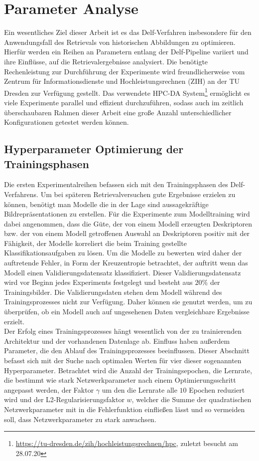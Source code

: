 \chapter{Parameter Analyse}

Ein wesentliches Ziel dieser Arbeit ist es das Delf-Verfahren insbesondere für den Anwendungsfall des Retrievals von historischen Abbildungen zu optimieren. Hierfür werden ein Reihen an Parametern entlang der Delf-Pipeline variiert und ihre Einflüsse, auf die Retrievalergebnisse analysiert.
Die benötigte Rechenleistung zur Durchführung der Experimente wird freundlicherweise vom 
Zentrum für Informationsdienste und Hochleistungsrechnen (ZIH) an der TU Dresden zur Verfügung gestellt. Das verwendete HPC-DA System\footnote{\url{https://tu-dresden.de/zih/hochleistungsrechnen/hpc}, zuletzt besucht am 28.07.20} ermöglicht es viele Experimente parallel und effizient durchzuführen, sodass auch im zeitlich überschaubaren Rahmen dieser Arbeit eine große Anzahl unterschiedlicher Konfigurationen getestet werden können.

\section{Hyperparameter Optimierung der Trainingsphasen}
Die ersten Experimentalreihen befassen sich mit den Trainingsphasen des Delf-Verfahrens. Um bei späteren Retrievalversuchen gute Ergebnisse erzielen zu können, benötigt man Modelle die in der Lage sind aussagekräftige Bildrepräsentationen zu erstellen. Für die Experimente zum Modelltraining wird dabei angenommen, dass die Güte, der von einem Modell erzeugten Deskriptoren bzw. der von einem Modell getroffenen Auswahl an Deskriptoren positiv mit der Fähigkeit, der Modelle korreliert die beim Training gestellte Klassifikationsaufgaben zu lösen. Um die Modelle zu bewerten wird daher der auftretende Fehler, in Form der Kreuzentropie betrachtet, der auftritt wenn das Modell einen Validierungsdatensatz klassifiziert. Dieser Validierungsdatensatz wird vor Beginn jedes Experiments festgelegt und besteht aus $20\%$ der Trainingsbilder. Die Validierungsdaten stehen dem Modell während des Trainingsprozesses nicht zur Verfügung. Daher können sie genutzt werden, um zu überprüfen, ob ein Modell auch auf ungesehenen Daten vergleichbare Ergebnisse erzielt.
\\
Der Erfolg eines Trainingsprozesses hängt wesentlich von der zu trainierenden Architektur und der vorhandenen Datenlage ab. Einfluss haben außerdem Parameter, die den Ablauf des Trainingsprozesses beeinflussen. Dieser Abschnitt befasst sich mit der Suche nach optimalen Werten für vier dieser sogenannten Hyperparameter. Betrachtet wird die Anzahl der Trainingsepochen, die Lernrate, die bestimmt wie stark Netzwerkparameter nach einem Optimierungsschritt angepasst werden, der Faktor $\gamma$ um den die Lernrate alle $10$ Epochen reduziert wird und der L2-Regularisierungsfaktor $w$, welcher die Summe der quadratischen Netzwerkparameter mit in die Fehlerfunktion einfließen lässt und so vermeiden soll, dass Netzwerkparameter zu stark anwachsen.


